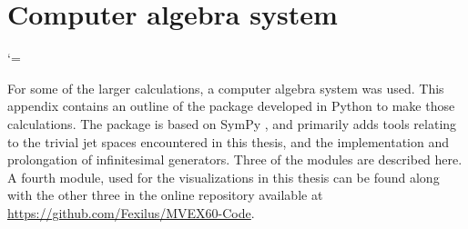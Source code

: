 \chapter{Computer algebra system} \label{app:computer-algebra}

\makeatletter
  \let\orig@item\item

  \def\item{%
      \@ifnextchar{[}%
          {\lstinline@item}%
          {\orig@item}%
  }

  \begingroup
  \catcode`\]=\active
  \gdef\lstinline@item[{%
      \setbox0\hbox\bgroup
          \catcode`\]=\active
          \let]\lstinline@item@end
  }
  \endgroup

  \def\lstinline@item@end{%
      \egroup
      \orig@item[\usebox0]%
  }
\makeatother

\makeatletter
\lst@CCPutMacro
    \@empty\z@\@empty
\makeatother  


For some of the larger calculations, a computer algebra system was used.
This appendix contains an outline of the package developed in Python to make those calculations.
The package is based on SymPy \cite{meurer2017sympy}, and primarily adds tools relating to the trivial jet spaces encountered in this thesis, and the implementation and prolongation of infinitesimal generators.
Three of the modules are described here.
A fourth module, used for the visualizations in this thesis can be found along with the other three in the online repository available at \href{https://github.com/Fexilus/MVEX60-Code}{https://github.com/Fexilus/MVEX60-Code}.

